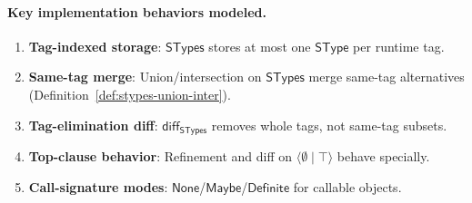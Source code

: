 \documentclass[11pt]{article}
\newcommand{\diff}{\mathsf{diff}}
\newcommand{\SType}{\mathsf{SType}}
\newcommand{\STypes}{\mathsf{STypes}}
\newcommand{\clause}[2]{\langle #1 \mid #2 \rangle}
\begin{document}
\paragraph{Key implementation behaviors modeled.}
\begin{enumerate}
\item \textbf{Tag-indexed storage}: $\STypes$ stores at most one $\SType$ per runtime tag.
\item \textbf{Same-tag merge}: Union/intersection on $\STypes$ merge same-tag alternatives (Definition~\ref{def:stypes-union-inter}).
\item \textbf{Tag-elimination diff}: $\diff_{\STypes}$ removes whole tags, not same-tag subsets.
\item \textbf{Top-clause behavior}: Refinement and diff on $\clause{\emptyset}{\top}$ behave specially.
\item \textbf{Call-signature modes}: $\mathsf{None}$/$\mathsf{Maybe}$/$\mathsf{Definite}$ for callable objects.
\end{enumerate}
\end{document}
